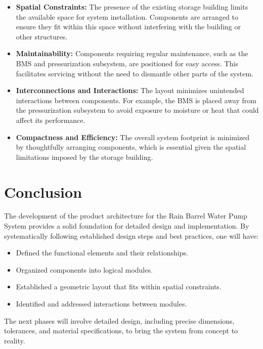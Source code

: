 \documentclass[12pt]{report}
\begin{document}
\begin{itemize}
    \item \textbf{Spatial Constraints:} The presence of the existing storage building limits the available space for system installation. Components are arranged to ensure they fit within this space without interfering with the building or other structures.

    \item \textbf{Maintainability:} Components requiring regular maintenance, such as the BMS and pressurization subsystem, are positioned for easy access. This facilitates servicing without the need to dismantle other parts of the system.

    \item \textbf{Interconnections and Interactions:} The layout minimizes unintended interactions between components. For example, the BMS is placed away from the pressurization subsystem to avoid exposure to moisture or heat that could affect its performance.

    \item \textbf{Compactness and Efficiency:} The overall system footprint is minimized by thoughtfully arranging components, which is essential given the spatial limitations imposed by the storage building.

\end{itemize}


\section{Conclusion}
\label{sec:conclusion}

The development of the product architecture for the Rain Barrel Water Pump System provides a solid foundation for detailed design and implementation. By systematically following established design steps and best practices, one will have:

\begin{itemize}
    \item Defined the functional elements and their relationships.
    \item Organized components into logical modules.
    \item Established a geometric layout that fits within spatial constraints.
    \item Identified and addressed interactions between modules.
\end{itemize}

The next phases will involve detailed design, including precise dimensions, tolerances, and material specifications, to bring the system from concept to reality.
\end{document}

